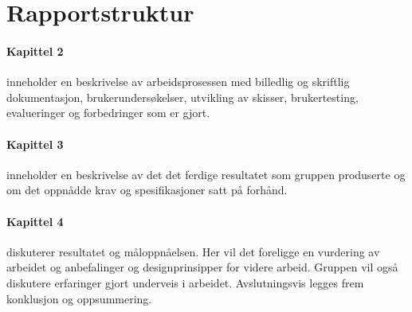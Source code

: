 \section{Rapportstruktur}
\paragraph{Kapittel 2} inneholder en beskrivelse av arbeidsprosessen med billedlig og skriftlig dokumentasjon, brukerundersøkelser, utvikling av skisser, brukertesting, evalueringer og forbedringer som er gjort.

\paragraph{Kapittel 3}
inneholder en beskrivelse av det det ferdige resultatet som gruppen produserte og om det oppnådde krav og spesifikasjoner satt på forhånd.

\paragraph{Kapittel 4}
diskuterer resultatet og måloppnåelsen. Her vil det foreligge en vurdering av arbeidet og anbefalinger og designprinsipper for videre arbeid. Gruppen vil også diskutere erfaringer gjort underveis i arbeidet. Avslutningsvis legges frem konklusjon og oppsummering.

